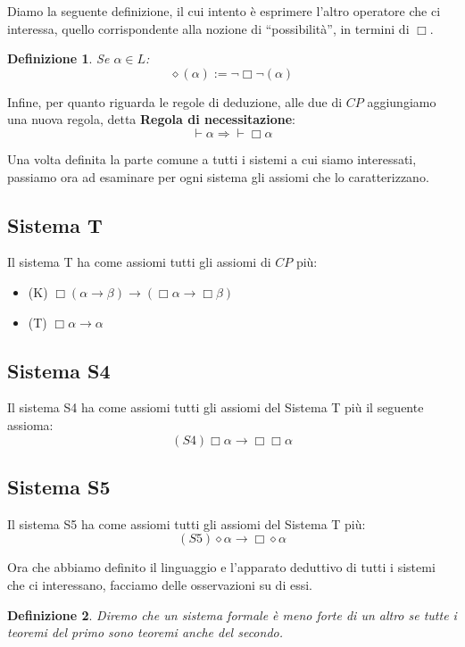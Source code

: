 \documentclass[a4paper, 12pt]{article}
\newtheorem{definition}{Definizione}
\begin{document}
Diamo la seguente definizione, il cui intento è esprimere l'altro operatore
che ci interessa, quello corrispondente alla nozione di ``possibilità'', in termini di $\Box$.

\begin{definition}
Se $\alpha \in L$:
$$\diamond (\alpha) := \neg \Box \neg (\alpha)$$
\end{definition}

Infine, per quanto riguarda le regole di deduzione, alle due di $CP$ aggiungiamo
una nuova regola, detta \textbf{Regola di necessitazione}:
$$\vdash \alpha \Rightarrow \vdash \Box \alpha$$

Una volta definita la parte comune a tutti i sistemi a cui siamo interessati,
passiamo ora ad esaminare per ogni sistema gli assiomi che lo caratterizzano.

\subsection{Sistema T}
Il sistema T ha come assiomi tutti gli assiomi di $CP$ più:
\begin{itemize}
\item (K) $\Box (\alpha \rightarrow \beta) \rightarrow (\Box \alpha \rightarrow \Box \beta)$
\item (T) $\Box \alpha \rightarrow \alpha$
\end{itemize}

\subsection{Sistema S4}
Il sistema S4 ha come assiomi tutti gli assiomi del Sistema T più il seguente assioma:
$$(S4) \Box \alpha \rightarrow \Box \Box \alpha$$

\subsection{Sistema S5}
Il sistema S5 ha come assiomi tutti gli assiomi del Sistema T più:
$$(S5) \diamond \alpha \rightarrow \Box \diamond \alpha$$


Ora che abbiamo definito il linguaggio e l'apparato deduttivo di tutti i sistemi
che ci interessano, facciamo delle osservazioni su di essi.
\begin{definition}
Diremo che un sistema formale è meno forte di un altro se tutte i teoremi del primo
sono teoremi anche del secondo.
\end{definition}
\end{document}
